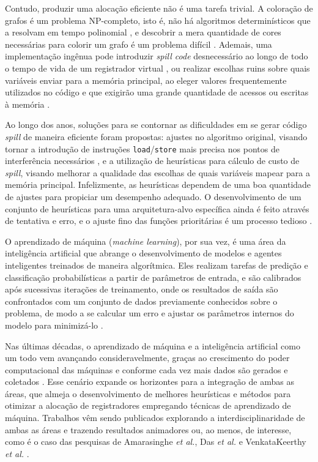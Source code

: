 \documentclass[
	12pt,				%
	openright,			%
	oneside,			%
	a4paper,			%
	tccpreliminar,			%
	]{ABNT-DC-UEL}
\begin{document}
Contudo, produzir uma alocação eficiente não é uma tarefa trivial. A coloração de grafos é um problema NP-completo, isto é, não há algoritmos determinísticos que a resolvam em tempo polinomial \cite{karp:72}, e descobrir a mera quantidade de cores necessárias para colorir um grafo é um problema difícil \cite{garey:76}. Ademais, uma implementação ingênua pode introduzir \textit{spill code} desnecessário ao longo de todo o tempo de vida de um registrador virtual \cite{bergner:97}, ou realizar escolhas ruins sobre quais variáveis enviar para a memória principal, ao eleger valores frequentemente utilizados no código e que exigirão uma grande quantidade de acessos ou escritas à memória \cite{bernstein:89}.

Ao longo dos anos, soluções para se contornar as dificuldades em se gerar código \textit{spill} de maneira eficiente foram propostas: ajustes no algoritmo original, visando tornar a introdução de instruções \texttt{load}/\texttt{store} mais precisa nos pontos de interferência necessários \cite{chaitin:82, briggs:92, briggs2:92, cooper:98}, e a utilização de heurísticas para cálculo de custo de \textit{spill}, visando melhorar a qualidade das escolhas de quais variáveis mapear para a memória principal. Infelizmente, as heurísticas dependem de uma boa quantidade de ajustes para propiciar um desempenho adequado. O desenvolvimento de um conjunto de heurísticas para uma arquitetura-alvo específica ainda é feito através de tentativa e erro, e o ajuste fino das funções prioritárias é um processo tedioso \cite{amarasinghe:03}.

O aprendizado de máquina (\textit{machine learning}), por sua vez, é uma área da inteligência artificial que abrange o desenvolvimento de modelos e agentes inteligentes treinados de maneira algorítmica. Eles realizam tarefas de predição e classificação probabilísticas a partir de parâmetros de entrada, e são calibrados após sucessivas iterações de treinamento, onde os resultados de saída são confrontados com um conjunto de dados previamente conhecidos sobre o problema, de modo a se calcular um erro e ajustar os parâmetros internos do modelo para minimizá-lo \cite{sharma:21}.

Nas últimas décadas, o aprendizado de máquina e a inteligência artificial como um todo vem avançando consideravelmente, graças ao crescimento do poder computacional das máquinas e conforme cada vez mais dados são gerados e coletados \cite{alpaydin:20}. Esse cenário expande os horizontes para a integração de ambas as áreas, que almeja o desenvolvimento de melhores heurísticas e métodos para otimizar a alocação de registradores empregando técnicas de aprendizado de máquina. Trabalhos vêm sendo publicados explorando a interdisciplinaridade de ambas as áreas e trazendo resultados animadores ou, ao menos, de interesse, como é o caso das pesquisas de Amarasinghe \textit{et al.}, Das \textit{et al.} e VenkataKeerthy \textit{et al.} \cite{amarasinghe:03, das:20, venkatakeerthy:23}.
\end{document}
